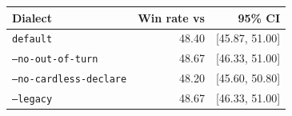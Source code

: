\begin{tabular}{lrr}
\toprule
Dialect & Win rate vs \vfive{} & 95\% CI \\
\midrule
\texttt{default} & 48.40 & [45.87, 51.00] \\
\texttt{--no-out-of-turn} & 48.67 & [46.33, 51.00] \\
\texttt{--no-cardless-declare} & 48.20 & [45.60, 50.80] \\
\texttt{--legacy} & 48.67 & [46.33, 51.00] \\
\bottomrule
\end{tabular}
